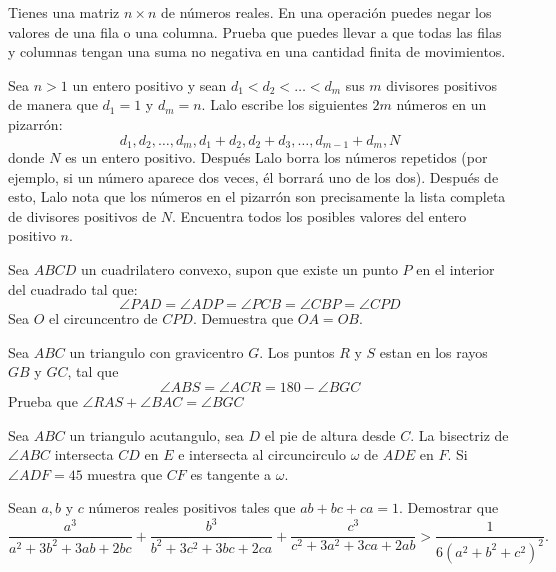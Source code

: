 \documentclass[11pt]{scrartcl}
\newcommand{\gad}{\textcolor{yellow}{$\bigstar$}}
\newcommand{\thmdifficulty}{0}
\newcommand{\problemdiff}[1]{\renewcommand{\thmdifficulty}{#1}}
\begin{document}
\problemdiff{4}
\begin{problem}
Tienes una matriz $n \times n$ de números reales. En una operación puedes negar los valores de una fila o una columna. Prueba que puedes llevar a que todas las filas y columnas tengan una suma no negativa en una cantidad finita de movimientos.    
\end{problem}

\problemdiff{4}
\begin{problem}
    [OMM 2022/5] 
    Sea $n>1$ un entero positivo y sean $d_1< d_2< \dots< d_m$ sus $m$ divisores positivos de manera que $d_1=1$ y $d_m=n$. Lalo escribe los siguientes $2m$ números en un pizarrón:
\[d_1,d_2,\dots,d_m,d_1+d_2,d_2+d_3,\dots,d_{m-1}+d_m,N\]
donde $N$ es un entero positivo. Después Lalo borra los números repetidos (por ejemplo, si un número aparece dos veces, él borrará uno de los dos). Después de esto, Lalo nota que los números en el pizarrón son precisamente la lista completa de divisores positivos de $N$. Encuentra todos los posibles valores del entero positivo $n$.
    
\end{problem}

\problemdiff{4}
\begin{problem}
    Sea $ABCD$ un cuadrilatero convexo, supon que existe un punto $P$ en el interior del cuadrado tal que: 
    \[ \angle PAD = \angle ADP = \angle PCB = \angle CBP =\angle CPD\]
    Sea $O$ el circuncentro de $CPD$. Demuestra que $OA=OB$.
\end{problem}

\problemdiff{5}
\begin{problem} [USA TSTST 2023/1 \gad] %
    Sea $ABC$ un triangulo con gravicentro $G$. Los puntos $R$ y $S$ estan en los rayos $GB$ y $GC$, tal que 
    $$\angle ABS=\angle ACR=180-\angle BGC$$
    Prueba que $\angle RAS+\angle BAC=\angle BGC$
\end{problem}

\problemdiff{5}
\begin{problem}
    Sea $ABC$ un triangulo acutangulo, sea $D$ el pie de altura desde $C$. La bisectriz de $\angle ABC$ intersecta $CD$ en $E$ e intersecta al circuncirculo $\omega$ de $ADE$ en $F$. Si $\angle ADF=45$ muestra que $CF$ es tangente a $\omega$.
\end{problem}

\problemdiff{5}
\begin{problem} [Centro 2023/3]
    
    Sean $a, b$ y $c$ números reales positivos tales que $a b+b c+c a=1$. Demostrar que
\[
\frac{a^{3}}{a^{2}+3 b^{2}+3 a b+2 b c}+\frac{b^{3}}{b^{2}+3 c^{2}+3 b c+2 c a}+\frac{c^{3}}{c^{2}+3 a^{2}+3 c a+2 a b}>\frac{1}{6\left(a^{2}+b^{2}+c^{2}\right)^{2}} .\]
    \label{OMCC23-3}
\end{problem}
\end{document}
